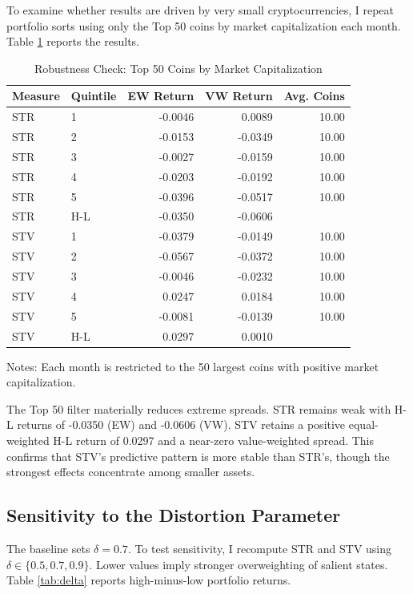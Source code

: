 \documentclass[11pt]{article}
\begin{document}
To examine whether results are driven by very small cryptocurrencies, I repeat portfolio sorts using only the Top 50 coins by market capitalization each month. Table \ref{tab:top50} reports the results.

\begin{table}[htbp]
\centering
\small
\singlespacing
\caption{Robustness Check: Top 50 Coins by Market Capitalization}
\label{tab:top50}
\begin{tabular}{llrrr}
\toprule
Measure & Quintile & EW Return & VW Return & Avg. Coins \\
\midrule
STR & 1 & -0.0046 & 0.0089 & 10.00 \\
STR & 2 & -0.0153 & -0.0349 & 10.00 \\
STR & 3 & -0.0027 & -0.0159 & 10.00 \\
STR & 4 & -0.0203 & -0.0192 & 10.00 \\
STR & 5 & -0.0396 & -0.0517 & 10.00 \\
STR & H-L & -0.0350 & -0.0606 &  \\
\midrule
STV & 1 & -0.0379 & -0.0149 & 10.00 \\
STV & 2 & -0.0567 & -0.0372 & 10.00 \\
STV & 3 & -0.0046 & -0.0232 & 10.00 \\
STV & 4 & 0.0247 & 0.0184 & 10.00 \\
STV & 5 & -0.0081 & -0.0139 & 10.00 \\
STV & H-L & 0.0297 & 0.0010 &  \\
\bottomrule
\end{tabular}
\begin{flushleft}
\footnotesize Notes: Each month is restricted to the 50 largest coins with positive market capitalization.
\end{flushleft}
\end{table}

The Top 50 filter materially reduces extreme spreads. STR remains weak with H-L returns of -0.0350 (EW) and -0.0606 (VW). STV retains a positive equal-weighted H-L return of 0.0297 and a near-zero value-weighted spread. This confirms that STV's predictive pattern is more stable than STR's, though the strongest effects concentrate among smaller assets.

\subsection{Sensitivity to the Distortion Parameter}

The baseline sets $\delta = 0.7$. To test sensitivity, I recompute STR and STV using $\delta \in \{0.5, 0.7, 0.9\}$. Lower values imply stronger overweighting of salient states. Table \ref{tab:delta} reports high-minus-low portfolio returns.
\end{document}
